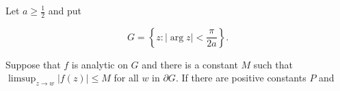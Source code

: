 Let $a \geq \frac{1}{2}$ and put

$$G = \left\{ z: |\arg z| < \frac{\pi}{2a} \right\}.$$

Suppose that $f$ is analytic on $G$ and there is a constant $M$ such that $\limsup_{z \to w} |f(z)| \leq M$ for all $w$ in $\partial G$. If there are positive constants $P$ and